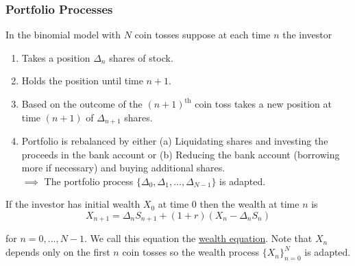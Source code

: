 \documentclass[12pt]{article}
\begin{document}
\subsubsection{Portfolio Processes}

In the binomial model with $N$ coin tosses suppose at each time $n$ the investor
\begin{enumerate}
	\item Takes a position $\Delta_n$ shares of stock.
	\item Holds the position until time $n + 1$.
	\item Based on the outcome of the $(n + 1)^{\text{th}}$ coin toss takes a new position at time $(n + 1)$ of $\Delta_{n + 1}$ shares.
	\item Portfolio is rebalanced by either (a) Liquidating shares and investing the proceeds in the bank account or (b) Reducing the bank account (borrowing more if necessary) and buying additional shares. \\
	
	$\implies$ The portfolio process $\{\Delta_0,\Delta_1,...,\Delta_{N - 1}\}$ is adapted.
\end{enumerate}

If the investor has initial wealth $X_0$ at time 0 then the wealth at time $n$ is 
\begin{equation*}
	X_{n + 1} = \Delta_nS_{n + 1} + (1 + r)(X_n - \Delta_nS_n)
\end{equation*}

for $n = 0,..., N - 1$. We call this equation the \underline{wealth equation}. Note that $X_n$ depends only on the first $n$ coin tosses so the wealth process $\{X_n\}_{n = 0}^N$ is adapted.
\end{document}
